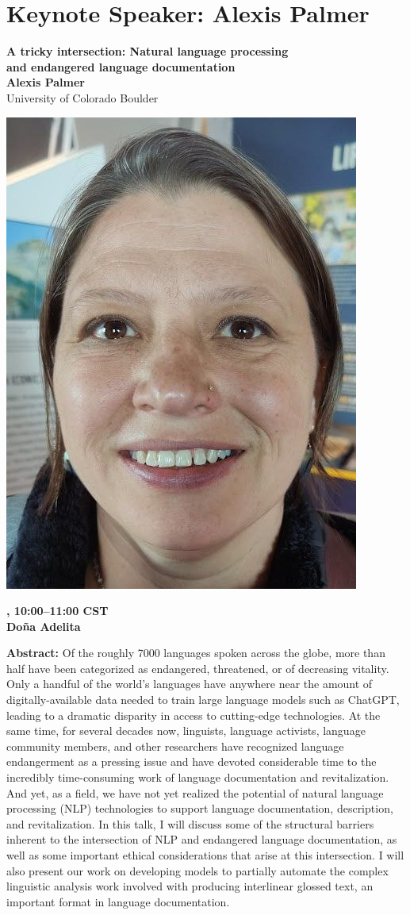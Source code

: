 \newpage
\section{Keynote Speaker: Alexis Palmer}

\begin{center}
{\bfseries\Large A tricky intersection: Natural language processing\\\vspace{2.0\lineskip} and endangered language documentation} \\
\vspace{1.0em}
{\large\bf Alexis Palmer} \\
University of Colorado Boulder

\includegraphics[width=0.4\linewidth]{content/mexican_nlp/palmer.png}

\textbf{\daydateyear{}, 10:00--11:00 CST}\\
\textbf{Do\~na Adelita}
\end{center}

\noindent
{\bfseries Abstract:}
Of the roughly 7000 languages spoken across the globe, more than half have been categorized as endangered, threatened, or of decreasing vitality. Only a handful of the world’s languages have anywhere near the amount of digitally-available data needed to train large language models such as ChatGPT, leading to a dramatic disparity in access to cutting-edge technologies. At the same time, for several decades now, linguists, language activists, language community members, and other researchers have recognized language endangerment as a pressing issue and have devoted considerable time to the incredibly time-consuming work of language documentation and revitalization. And yet, as a field, we have not yet realized the potential of natural language processing (NLP) technologies to support language documentation, description, and revitalization. In this talk, I will discuss some of the structural barriers inherent to the intersection of NLP and endangered language documentation, as well as some important ethical considerations that arise at this intersection. I will also present our work on developing models to partially automate the complex linguistic analysis work involved with producing interlinear glossed text, an important format in language documentation.

